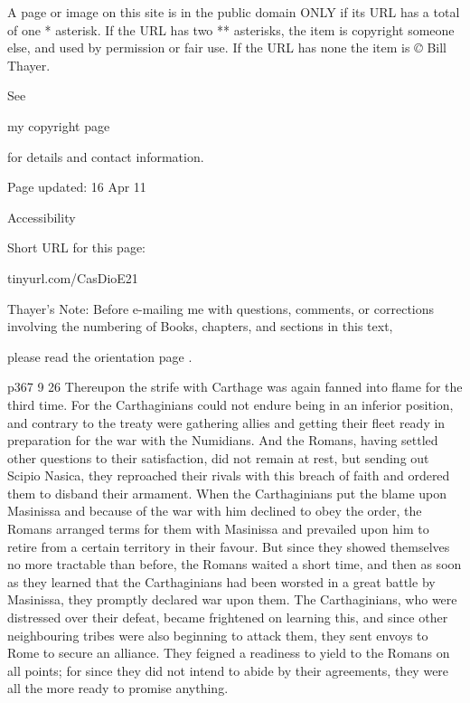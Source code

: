 A page or image on this site is in the public domain ONLY if its URL has a total of one * asterisk. If the URL has two ** asterisks, the item is copyright someone else, and used by permission or fair use. If the URL has none the item is \emph{©} Bill Thayer.

See

my copyright page

for details and contact information.

Page updated:
16 Apr 11

Accessibility


Short URL for this page:

tinyurl.com/CasDioE21

Thayer's Note: Before e-mailing me with questions, comments, or corrections involving the numbering of Books, chapters, and sections in this text,

please read the orientation page .

p367
9
26
Thereupon the strife with Carthage was again fanned into flame for the third time. For the Carthaginians could not endure being in an inferior position, and contrary to the treaty were gathering allies and getting their fleet ready in preparation for the war with the Numidians. And the Romans, having settled other questions to their satisfaction, did not remain at rest, but sending out Scipio Nasica, they reproached their rivals with this breach of faith and ordered them to disband their armament. When the Carthaginians put the blame upon Masinissa and because of the war with him declined to obey the order, the Romans arranged terms for them with Masinissa and prevailed upon him to retire from a certain territory in their favour. But since they showed themselves no more tractable than before, the Romans waited a short time, and then as soon as they learned that the Carthaginians had been worsted in a great battle by Masinissa, they promptly declared war upon them. The Carthaginians, who were distressed over their defeat, became frightened on learning this, and since other neighbouring tribes were also beginning to attack them, they sent envoys to Rome to secure an alliance. They feigned a readiness to yield to the Romans on all points; for since they did not intend to abide by their agreements, they were all the more ready to promise anything.

